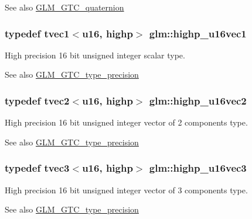 \begin{DoxySeeAlso}{See also}
\hyperlink{group__gtc__quaternion}{G\+L\+M\+\_\+\+G\+T\+C\+\_\+quaternion} 
\end{DoxySeeAlso}
\hypertarget{namespaceglm_a7dc03cbaf98b6e427cc4d3c83d446c54}{}
\subsubsection[{highp\+\_\+u16vec1}]{\setlength{\rightskip}{0pt plus 5cm}typedef tvec1$<${\bf u16}, highp$>$ {\bf glm\+::highp\+\_\+u16vec1}}\label{namespaceglm_a7dc03cbaf98b6e427cc4d3c83d446c54}
High precision 16 bit unsigned integer scalar type. \begin{DoxySeeAlso}{See also}
\hyperlink{group__gtc__type__precision}{G\+L\+M\+\_\+\+G\+T\+C\+\_\+type\+\_\+precision} 
\end{DoxySeeAlso}
\hypertarget{namespaceglm_a9c2e311542a1eec13b15e959036e0c34}{}
\subsubsection[{highp\+\_\+u16vec2}]{\setlength{\rightskip}{0pt plus 5cm}typedef tvec2$<${\bf u16}, highp$>$ {\bf glm\+::highp\+\_\+u16vec2}}\label{namespaceglm_a9c2e311542a1eec13b15e959036e0c34}
High precision 16 bit unsigned integer vector of 2 components type. \begin{DoxySeeAlso}{See also}
\hyperlink{group__gtc__type__precision}{G\+L\+M\+\_\+\+G\+T\+C\+\_\+type\+\_\+precision} 
\end{DoxySeeAlso}
\hypertarget{namespaceglm_aba289b0588476cf2d90f11029c47461f}{}
\subsubsection[{highp\+\_\+u16vec3}]{\setlength{\rightskip}{0pt plus 5cm}typedef tvec3$<${\bf u16}, highp$>$ {\bf glm\+::highp\+\_\+u16vec3}}\label{namespaceglm_aba289b0588476cf2d90f11029c47461f}
High precision 16 bit unsigned integer vector of 3 components type. \begin{DoxySeeAlso}{See also}
\hyperlink{group__gtc__type__precision}{G\+L\+M\+\_\+\+G\+T\+C\+\_\+type\+\_\+precision} 
\end{DoxySeeAlso}
\hypertarget{namespaceglm_a9d020e4972de8e94684c49f2587b1235}{}
